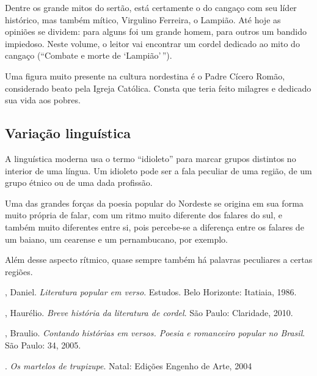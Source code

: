 Dentre os grande mitos do sertão, está certamente o do cangaço com seu
líder histórico, mas também mítico, Virgulino Ferreira, o Lampião. Até
hoje as opiniões se dividem: para alguns foi um grande homem, para
outros um bandido impiedoso. Neste volume, o leitor vai encontrar 
um cordel dedicado ao mito do cangaço (``Combate e morte de `Lampião'\,''). 

Uma figura muito presente na cultura nordestina é o Padre Cícero Romão,
considerado beato pela Igreja Católica. Consta que teria feito milagres
e dedicado sua vida aos pobres. 

\subsection{Variação linguística}

A linguística moderna usa o termo
``idioleto'' para marcar grupos
distintos no interior de uma língua. Um idioleto pode ser a fala
peculiar de uma região, de um grupo étnico ou de uma dada profissão. 

Uma das grandes forças da poesia popular do Nordeste se origina em sua
forma muito própria de falar, com um ritmo muito diferente dos falares
do sul, e também muito diferentes entre si, pois percebe-se a diferença
entre os falares de um baiano, um cearense e um pernambucano, por
exemplo.

Além desse aspecto rítmico, quase sempre também há palavras peculiares a
certas regiões. 

\begin{bibliohedra}

, Daniel. \textit{Literatura popular em verso}. Estudos. Belo Horizonte: Itatiaia, 1986. 

, Haurélio. \textit{Breve história da literatura de cordel}. São Paulo: Claridade, 2010.

, Braulio. \textit{Contando histórias em versos. Poesia e romanceiro popular 
no Brasil}. São Paulo: 34, 2005.

\titidem. \textit{Os martelos de trupizupe}. Natal: Edições Engenho de Arte, 2004


\end{bibliohedra}